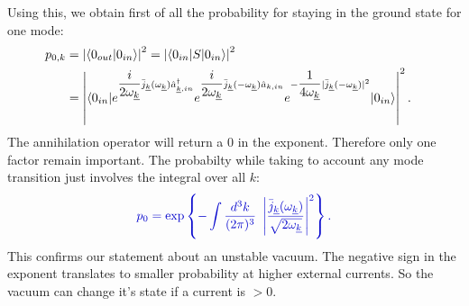 \documentclass[12pt, titlepage]{article}
\begin{document}
\begin{subappendices}
Using this, we obtain first of all the probability for staying in the ground state for one mode:
\begin{subequations}
\begin{align}
p_{0,k}&=\left| \braket{0_{out}|0_{in}}\right|^{2}=\left| \braket{0_{in}|S|0_{in}}\right|^{2}
	&\\
	&=\left| \braket{0_{in}|e^{\dfrac{i}{2\omega_{\underline{k}}}\bar{j}_{\underline{k}}(\omega_{\underline{k}})\hat{a}^{\dagger}_{\underline{k},in}}
e^{\dfrac{i}{2\omega_{\underline{k}}}\bar{j}_{\underline{k}}(-\omega_{\underline{k}})\hat{a}_{k,in}}
e^{-\dfrac{1}{4\omega_{\underline{k}}}|\bar{j}_{\underline{k}}(-\omega_{\underline{k}})|^{2}}|0_{in}}\right|^{2}
.
\end{align}
\end{subequations}
The annihilation operator will return a $ 0 $ in the exponent. Therefore only one factor remain important. The probabilty while taking to account any mode transition just involves the integral over all $ k $:
\begin{equation}\label{prob_staying}
 \textcolor[RGB]{0,0,204}{
	p_{0}
	= 	\exp\left\lbrace -\int \dfrac{d^{3}k}{(2\pi)^{3}} \ 
 		 			 \left| \dfrac{\bar{j}_{\underline{k}}(\omega_{\underline{k}})}{\sqrt{2\omega_{\underline{k}}}} \right|^{2}
 		 			 \right\rbrace 
 .}
\end{equation}
This confirms our statement about an unstable vacuum. The negative sign in the exponent translates to smaller probability at higher external currents. So the vacuum can change it's state if a current is $ >0 $.
\\\\

\end{subappendices}
\end{document}
